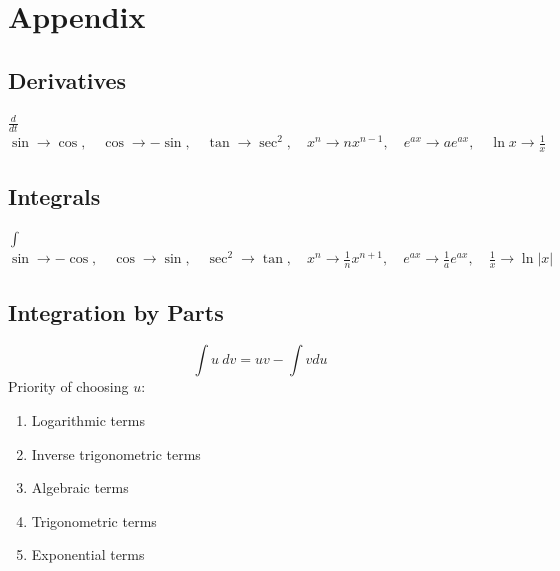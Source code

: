 \documentclass[a4paper]{article}
\begin{document}
\newpage
\appendix
\section{Appendix}
\subsection{Derivatives}
\begin{center}
    $\displaystyle\frac{d}{dt}$\\[0.5cm]
    $\sin\rightarrow\cos,\quad \cos\rightarrow -\sin,\quad \tan\rightarrow\sec^2,\quad x^n\rightarrow nx^{n-1},\quad e^{ax}\rightarrow ae^{ax}, \quad \ln x \rightarrow \displaystyle\frac{1}{x}$
\end{center}
\subsection{Integrals}
\begin{center}
    $\int$\\[0.5cm]
    $\sin\rightarrow -\cos,\quad \cos\rightarrow\sin,\quad \sec^2\rightarrow\tan,\quad x^n\rightarrow\displaystyle\frac{1}{n}x^{n+1},\quad e^{ax}\rightarrow\displaystyle\frac{1}{a}e^{ax},\quad \displaystyle\frac{1}{x}\rightarrow\ln |x|$
\end{center}
\subsection{Integration by Parts}
$$\int u\ dv = uv -\int v du$$
Priority of choosing $u$:
\begin{enumerate}
    \item Logarithmic terms
    \item Inverse trigonometric terms
    \item Algebraic terms
    \item Trigonometric terms
    \item Exponential terms
\end{enumerate}
\end{document}
